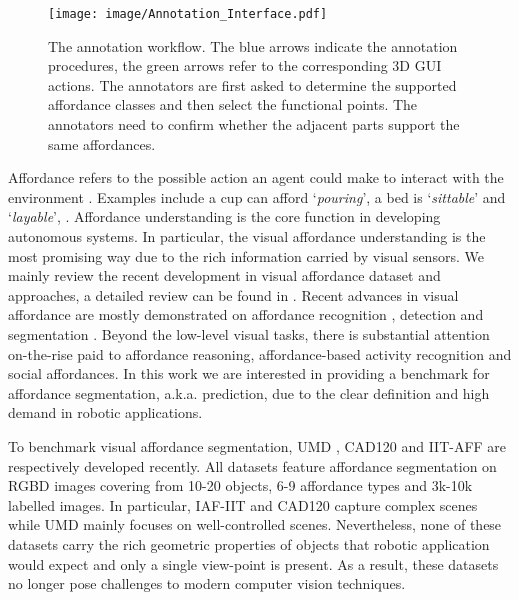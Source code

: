 \documentclass[final]{cvpr}
\begin{document}
\begin{figure*}[t]
   \begin{center}
      \texttt{[image: image/Annotation\_Interface.pdf]}
   \end{center}
   \vspace{-0.4cm}
   \caption{The annotation workflow. The blue arrows indicate the annotation procedures,
      the green arrows refer to the corresponding 3D GUI actions. The annotators are first asked to
      determine the supported affordance classes and then select the functional points. The annotators
      need to confirm whether the adjacent parts support the same affordances.}
   \label{figure.interface}
   \vspace{-0.5cm}
\end{figure*}

Affordance refers to the possible action an agent could make to interact with the environment \cite{gibson1979ecological}. Examples include a cup can afford `\textit{pouring}', a bed is `\textit{sittable}' and `\textit{layable}', \etc. Affordance understanding is the core function in developing autonomous systems. In particular, the visual affordance understanding is the most promising way due to the rich information carried by visual sensors. We mainly review the recent development in visual affordance dataset and approaches, a detailed review can be found in \cite{hassanin2018visual}. Recent advances in visual affordance are mostly demonstrated on affordance recognition \cite{grabner2011makes,do2018affordancenet}, detection \cite{do2018affordancenet, myers2015affordance} and segmentation \cite{do2018affordancenet, myers2015affordance}. Beyond the low-level visual tasks, there is substantial attention on-the-rise paid to affordance reasoning, affordance-based activity recognition and social affordances. In this work we are interested in providing a benchmark for affordance segmentation, a.k.a. prediction, due to the clear definition and high demand in robotic applications. 

To benchmark visual affordance segmentation, UMD \cite{myers2015affordance}, CAD120 \cite{sawatzky2017weakly} and IIT-AFF \cite{nguyen2017object} are respectively developed recently. All datasets feature affordance segmentation on RGBD images covering from 10-20 objects, 6-9 affordance types and 3k-10k labelled images. In particular, IAF-IIT and CAD120 capture complex scenes while UMD mainly focuses on well-controlled scenes. Nevertheless, none of these datasets carry the rich geometric properties of objects that robotic application would expect and only a single view-point is present. As a result, these datasets no longer pose challenges to modern computer vision techniques.
\end{document}
